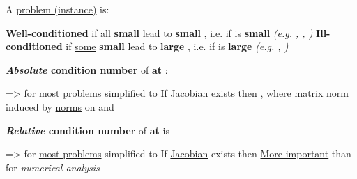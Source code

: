 A \ul{problem (instance)} is:
\begin{itemize}

      \vItem
            \textbf{Well-conditioned} if \ul{all} \textbf{small} 
            lead to \textbf{small} , i.e. if \iMbox{\kappa} is
            \textbf{small} \emph{(e.g. , , )}
      \vItem
            \textbf{Ill-conditioned} if \ul{some} \textbf{small} 
            lead to \textbf{large} , i.e. if \iMbox{\kappa} is
            \textbf{large} \emph{(e.g. , )}
\end{itemize}

\hSep %

\textbf{\emph{Absolute} condition number} 
of \textbf{ at }:
\begin{itemize}

      \vItem

            => for \ul{most problems} simplified to
      \vItem
            If \ul{Jacobian}  exists then ,
            where \ul{matrix norm} \iMbox{\lVert - \rVert} induced by \ul{norms} on  and 
\end{itemize}

\textbf{\emph{Relative} condition number}  of \textbf{ at } is
\begin{itemize}

      \vItem

            => for \ul{most problems} simplified to
      \vItem
            If \ul{Jacobian}  exists then
      \vItem
            \ul{More important} than \iMbox{\hat{\kappa}} for \emph{numerical analysis}
\end{itemize}

